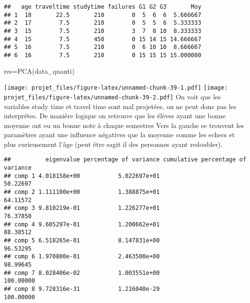 \documentclass[
]{article}
\newenvironment{Shaded}{\begin{snugshade}}{\end{snugshade}}
\newcommand{\FunctionTok}[1]{\textcolor[rgb]{0.00,0.00,0.00}{#1}}
\newcommand{\NormalTok}[1]{#1}
\newcommand{\OtherTok}[1]{\textcolor[rgb]{0.56,0.35,0.01}{#1}}
\newcommand{\SpecialCharTok}[1]{\textcolor[rgb]{0.00,0.00,0.00}{#1}}
\begin{document}
\begin{verbatim}
##   age traveltime studytime failures G1 G2 G3       Moy
## 1  18       22.5       210        0  5  6  6  5.666667
## 2  17        7.5       210        0  5  5  6  5.333333
## 3  15        7.5       210        3  7  8 10  8.333333
## 4  15        7.5       450        0 15 14 15 14.666667
## 5  16        7.5       210        0  6 10 10  8.666667
## 6  16        7.5       210        0 15 15 15 15.000000
\end{verbatim}

\begin{Shaded}
\begin{Highlighting}[]
\NormalTok{res}\OtherTok{=}\FunctionTok{PCA}\NormalTok{(data\_quanti)}
\end{Highlighting}
\end{Shaded}

\texttt{[image: projet\_files/figure-latex/unnamed-chunk-39-1.pdf]}
\texttt{[image: projet\_files/figure-latex/unnamed-chunk-39-2.pdf]} On
voit que les variables study time et travel time sont mal projetées, on
ne peut donc pas les interprétes. De manière logique on retrouve que les
élèves ayant une bonne moyenne ont eu un bonne note à chaque semestres
Vers la gauche se trouvent les paramètres ayant une influence négatives
que la moyenne comme les echecs et plus curieusement l'âge (peut être
sagit il des personnes ayant redoubler).

\begin{Shaded}
\end{Shaded}

\begin{verbatim}
##          eigenvalue percentage of variance cumulative percentage of variance
## comp 1 4.018158e+00           5.022697e+01                          50.22697
## comp 2 1.111100e+00           1.388875e+01                          64.11572
## comp 3 9.810219e-01           1.226277e+01                          76.37850
## comp 4 9.605297e-01           1.200662e+01                          88.38512
## comp 5 6.518265e-01           8.147831e+00                          96.53295
## comp 6 1.970800e-01           2.463500e+00                          98.99645
## comp 7 8.028406e-02           1.003551e+00                         100.00000
## comp 8 9.728316e-31           1.216040e-29                         100.00000
\end{verbatim}
\end{document}
